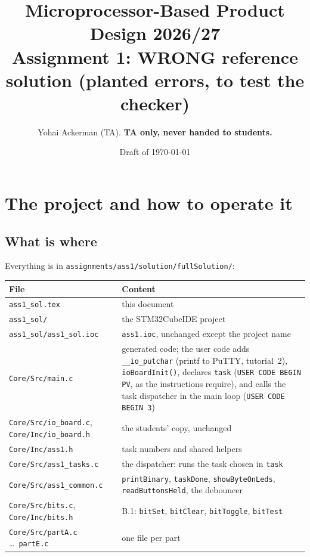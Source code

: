 \documentclass[11pt,a4paper]{article}
\title{Microprocessor-Based Product Design 2026/27\\[2pt]\large Assignment 1: WRONG reference solution (planted errors, to test the checker)}
\author{Yohai Ackerman (TA). \textbf{TA only, never handed to students.}}
\date{Draft of \today}
\newcommand{\lv}[1]{\texttt{#1}}                 %
\begin{document}
\maketitle

\section{The project and how to operate it}

\subsection{What is where}
Everything is in \texttt{assignments/ass1/solution/fullSolution/}:

\smallskip\noindent
\begin{tabularx}{\textwidth}{@{}l L@{}}
\toprule
File & Content \\
\midrule
\texttt{ass1\_sol.tex} & this document \\
\texttt{ass1\_sol/} & the STM32CubeIDE project \\
\texttt{ass1\_sol/ass1\_sol.ioc} & \texttt{ass1.ioc}, unchanged except the project name \\
\texttt{Core/Src/main.c} & generated code; the user code adds \texttt{\_\_io\_putchar} (printf to PuTTY, tutorial~2),
  \texttt{ioBoardInit()}, declares \lv{task} (\texttt{USER CODE BEGIN PV}, as the instructions require), and calls
  the task dispatcher in the main loop (\texttt{USER CODE BEGIN 3}) \\
\texttt{Core/Src/io\_board.c}, \texttt{Core/Inc/io\_board.h} & the students' copy, unchanged \\
\texttt{Core/Inc/ass1.h} & task numbers and shared helpers \\
\texttt{Core/Src/ass1\_tasks.c} & the dispatcher: runs the task chosen in \lv{task} \\
\texttt{Core/Src/ass1\_common.c} & \texttt{printBinary}, \texttt{taskDone}, \texttt{showByteOnLeds},
  \texttt{readButtonsHeld}, the debouncer \\
\texttt{Core/Src/bits.c}, \texttt{Core/Inc/bits.h} & B.1: \texttt{bitSet}, \texttt{bitClear}, \texttt{bitToggle},
  \texttt{bitTest} \\
\texttt{Core/Src/partA.c} \ldots\ \texttt{partE.c} & one file per part \\
\bottomrule
\end{tabularx}
\end{document}
